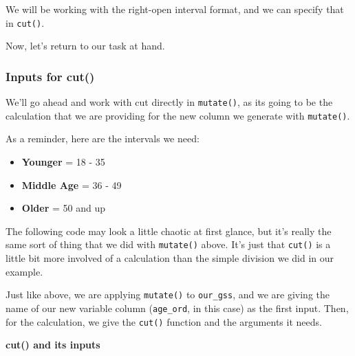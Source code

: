 \documentclass[
  letterpaper,
  DIV=11,
  numbers=noendperiod]{scrreprt}
\providecommand{\tightlist}{%
  \setlength{\itemsep}{0pt}\setlength{\parskip}{0pt}}
\begin{document}
We will be working with the right-open interval format, and we can
specify that in \texttt{cut()}.

Now, let's return to our task at hand.

\subsubsection{Inputs for cut()}\label{inputs-for-cut}

We'll go ahead and work with cut directly in \texttt{mutate()}, as its
going to be the calculation that we are providing for the new column we
generate with \texttt{mutate()}.

As a reminder, here are the intervals we need:

\begin{itemize}
\tightlist
\item
  \textbf{Younger} = 18 - 35
\item
  \textbf{Middle Age} = 36 - 49
\item
  \textbf{Older} = 50 and up
\end{itemize}

The following code may look a little chaotic at first glance, but it's
really the same sort of thing that we did with \texttt{mutate()} above.
It's just that \texttt{cut()} is a little bit more involved of a
calculation than the simple division we did in our example.

Just like above, we are applying \texttt{mutate()} to \texttt{our\_gss},
and we are giving the name of our new variable column
(\texttt{age\_ord}, in this case) as the first input. Then, for the
calculation, we give the \texttt{cut()} function and the arguments it
needs.

\textbf{cut() and its inputs}
\end{document}
